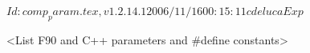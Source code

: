 $Id: comp_param.tex,v 1.2.14.1 2006/11/16 00:15:11 cdeluca Exp $
%


<List F90 and C++ parameters and \#define constants>
